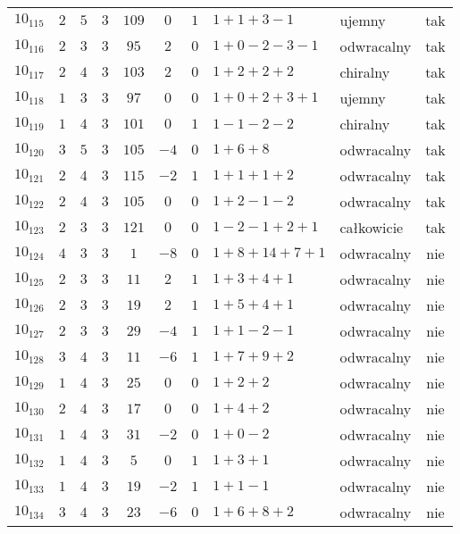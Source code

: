 \begin{longtable}{lccccccllc}
$10_{115}$ & $2$   & $5$ & $3$ & $109$ & $0$  & $1$ & $1+1+3-1$     & ujemny     & tak \\
$10_{116}$ & $2$   & $3$ & $3$ & $95$  & $2$  & $0$ & $1+0-2-3-1$   & odwracalny & tak \\
$10_{117}$ & $2$   & $4$ & $3$ & $103$ & $2$  & $0$ & $1+2+2+2$     & chiralny   & tak \\
$10_{118}$ & $1$   & $3$ & $3$ & $97$  & $0$  & $0$ & $1+0+2+3+1$   & ujemny     & tak \\
$10_{119}$ & $1$   & $4$ & $3$ & $101$ & $0$  & $1$ & $1-1-2-2$     & chiralny   & tak \\
$10_{120}$ & $3$   & $5$ & $3$ & $105$ & $-4$ & $0$ & $1+6+8$       & odwracalny & tak \\
$10_{121}$ & $2$   & $4$ & $3$ & $115$ & $-2$ & $1$ & $1+1+1+2$     & odwracalny & tak \\
$10_{122}$ & $2$   & $4$ & $3$ & $105$ & $0$  & $0$ & $1+2-1-2$     & odwracalny & tak \\
$10_{123}$ & $2$   & $3$ & $3$ & $121$ & $0$  & $0$ & $1-2-1+2+1$   & całkowicie & tak \\
$10_{124}$ & $4$   & $3$ & $3$ & $1$   & $-8$ & $0$ & $1+8+14+7+1$  & odwracalny & nie \\
$10_{125}$ & $2$   & $3$ & $3$ & $11$  & $2$  & $1$ & $1+3+4+1$     & odwracalny & nie \\
$10_{126}$ & $2$   & $3$ & $3$ & $19$  & $2$  & $1$ & $1+5+4+1$     & odwracalny & nie \\
$10_{127}$ & $2$   & $3$ & $3$ & $29$  & $-4$ & $1$ & $1+1-2-1$     & odwracalny & nie \\
$10_{128}$ & $3$   & $4$ & $3$ & $11$  & $-6$ & $1$ & $1+7+9+2$     & odwracalny & nie \\
$10_{129}$ & $1$   & $4$ & $3$ & $25$  & $0$  & $0$ & $1+2+2$       & odwracalny & nie \\
$10_{130}$ & $2$   & $4$ & $3$ & $17$  & $0$  & $0$ & $1+4+2$       & odwracalny & nie \\
$10_{131}$ & $1$   & $4$ & $3$ & $31$  & $-2$ & $0$ & $1+0-2$       & odwracalny & nie \\
$10_{132}$ & $1$   & $4$ & $3$ & $5$   & $0$  & $1$ & $1+3+1$       & odwracalny & nie \\
$10_{133}$ & $1$   & $4$ & $3$ & $19$  & $-2$ & $1$ & $1+1-1$       & odwracalny & nie \\
$10_{134}$ & $3$   & $4$ & $3$ & $23$  & $-6$ & $0$ & $1+6+8+2$     & odwracalny & nie \\

\end{longtable}
